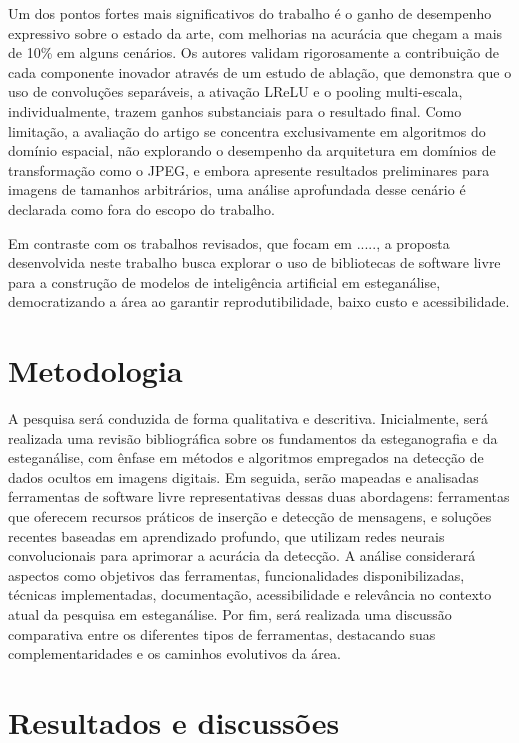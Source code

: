 \documentclass[12pt]{article}
\begin{document}
Um dos pontos fortes mais significativos do trabalho é o ganho de desempenho
expressivo sobre o estado da arte, com melhorias na acurácia que chegam a mais
de 10\% em alguns cenários. Os autores validam rigorosamente a contribuição de
cada componente inovador através de um estudo de ablação, que demonstra que o
uso de convoluções separáveis, a ativação LReLU e o pooling multi-escala,
individualmente, trazem ganhos substanciais para o resultado final. Como
limitação, a avaliação do artigo se concentra exclusivamente em algoritmos do
domínio espacial, não explorando o desempenho da arquitetura em domínios de
transformação como o JPEG, e embora apresente resultados preliminares para
imagens de tamanhos arbitrários, uma análise aprofundada desse cenário é
declarada como fora do escopo do trabalho.

Em contraste com os trabalhos revisados, que focam em ....., a proposta
desenvolvida neste trabalho busca explorar o uso de bibliotecas de software
livre para a construção de modelos de inteligência artificial em esteganálise,
democratizando a área ao garantir reprodutibilidade, baixo custo e
acessibilidade.

\section{Metodologia}
A pesquisa será conduzida de forma qualitativa e descritiva. Inicialmente, será
realizada uma revisão bibliográfica sobre os fundamentos da esteganografia e da
esteganálise, com ênfase em métodos e algoritmos empregados na detecção de
dados ocultos em imagens digitais. Em seguida, serão mapeadas e analisadas
ferramentas de software livre representativas dessas duas abordagens:
ferramentas que oferecem recursos práticos de inserção e detecção de mensagens,
e soluções recentes baseadas em aprendizado profundo, que utilizam redes
neurais convolucionais para aprimorar a acurácia da detecção. A análise
considerará aspectos como objetivos das ferramentas, funcionalidades
disponibilizadas, técnicas implementadas, documentação, acessibilidade e
relevância no contexto atual da pesquisa em esteganálise. Por fim, será
realizada uma discussão comparativa entre os diferentes tipos de ferramentas,
destacando suas complementaridades e os caminhos evolutivos da área.

\section{Resultados e discussões}
\end{document}
